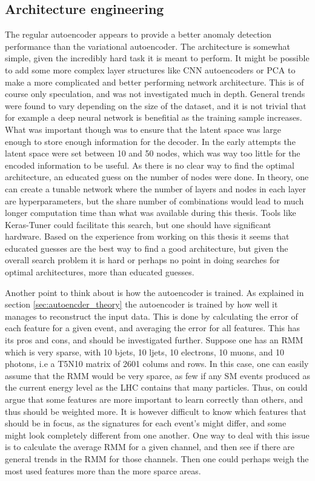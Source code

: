\subsection*{Architecture engineering}
The regular autoencoder appears to provide a better anomaly detection performance than the variational autoencoder. 
The architecture is somewhat simple, given the incredibly hard task it is meant to perform. It might be possible to 
add some more complex layer structures like CNN autoencoders or PCA to make a more complicated and better performing 
network architecture. This is of course only speculation, and was not investigated much in depth. General trends were 
found to vary depending on the size of the dataset, and it is not trivial that for example a deep neural network is 
benefitial as the training sample increases. What was important though was to ensure that the latent space was large 
enough to store enough information for the decoder. In the early attempts the latent space were set between 10 and 50 
nodes, which was way too little for the encoded information to be useful. As there is no clear way to find the optimal 
architecture, an educated guess on the number of nodes were done. In theory, one can create a tunable network where 
the number of layers and nodes in each layer are hyperparameters, but the share number of combinations would lead to 
much longer computation time than what was available during this thesis. Tools like Keras-Tuner could facilitate 
this search, but one should have significant hardware. Based on the experience from working on this thesis it seems 
that educated guesses are the best way to find a good architecture, but given the overall search problem it is hard 
or perhaps no point in doing searches for optimal architectures, more than educated guesses. \par 
Another point to think about is how the autoencoder is trained. As explained in section \ref{sec:autoencder_theory}
the autoencoder is trained by how well it manages to reconstruct the input data. This is done by 
calculating the error of each feature for a given event, and averaging the error for all features. 
This has its pros and cons, and should be investigated further. Suppose one has an RMM which is very sparse, 
with 10 bjets, 10 ljets, 10 electrons, 10 muons, and 10 photons, i.e a T5N10 matrix of 2601 colums and rows. 
In this case, one can easily assume that the RMM would be very sparce, as few if any SM events produced 
as the current energy level as the LHC contains that many particles. Thus, on could argue that some features 
are more important to learn correctly than others, and thus should be weighted more. It is however difficult to 
know which features that should be in focus, as the signatures for each event's might differ, and some 
might look completely different from one another. One way to deal with this issue is to calculate 
the average RMM for a given channel, and then see if there are general trends in the RMM for those channels. 
Then one could perhaps weigh the most used features more than the more sparce areas. 